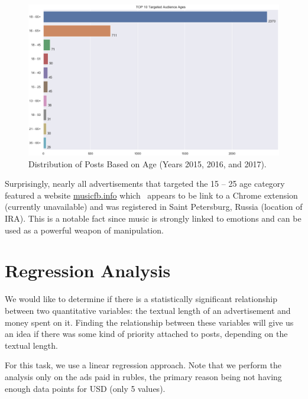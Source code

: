 \documentclass{article}
\begin{document}
\begin{figure}[H]
\centering
\includegraphics[width=\linewidth]{./image/barchart-plots/barchart_targeted_age.png}
\caption{Distribution of Posts Based on Age (Years 2015, 2016, and 2017).}
\end{figure}

Surprisingly, nearly all advertisements that targeted the 15 -- 25 age category
featured a website \url{musicfb.info} which~\cite{musicfb-info} appears to be
link to a Chrome extension (currently unavailable) and was registered in Saint
Petersburg, Russia (location of IRA). This is a notable fact since music is
strongly linked to emotions and can be used as a powerful weapon of
manipulation.


\section{Regression Analysis}

We would like to determine if there is a statistically significant relationship
between two quantitative variables: the textual length of an advertisement and
money spent on it. Finding the relationship between these variables will give
us an idea if there was some kind of priority attached to posts, depending on
the textual length.

\medskip

For this task, we use a linear regression approach. Note that we perform the
analysis only on the ads paid in rubles, the primary reason being not having
enough data points for USD (only 5 values).
\end{document}
